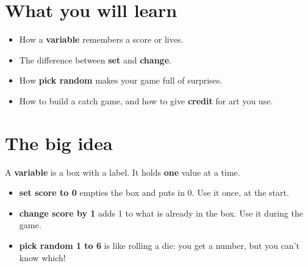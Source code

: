 
\section{What you will learn}
\begin{itemize}[leftmargin=1.2em,itemsep=1pt]
  \item How a \textbf{variable} remembers a score or lives.
  \item The difference between \textbf{set} and \textbf{change}.
  \item How \textbf{pick random} makes your game full of surprises.
  \item How to build a catch game, and how to give \textbf{credit} for art you use.
\end{itemize}

\section{The big idea}
A \textbf{variable} is a box with a label. It holds \textbf{one} value at a time.

\begin{center}
\end{center}

\begin{itemize}[leftmargin=1.2em,itemsep=1pt]
  \item \textbf{set score to 0} empties the box and puts in 0. Use it once, at the start.
  \item \textbf{change score by 1} adds 1 to what is already in the box. Use it during the game.
  \item \textbf{pick random 1 to 6} is like rolling a die: you get a number, but you can't know which!
\end{itemize}

